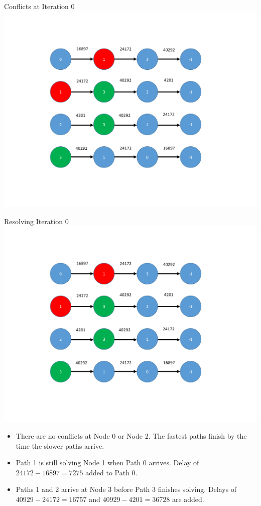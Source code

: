 \documentclass[xcolor={usenames,dvipsnames,svgnames,table}]{beamer}
\begin{document}
\begin{frame}[t]{Conflicts at Iteration 0}
\centering
\includegraphics[trim={2cm 2cm 4cm 2cm},clip,scale=0.45]{figures/solve_only_conflicts.pdf}
\end{frame}

\begin{frame}[t]{Resolving Iteration 0}
\centering
\includegraphics[trim={2cm 2cm 4cm 2cm},clip,scale=0.2]{figures/solve_only_conflicts.pdf}
\begin{block}{}
\begin{itemize}
\item There are no conflicts at Node 0 or Node 2. The fastest paths finish by the time the slower paths arrive.
\item Path 1 is still solving Node 1 when Path 0 arrives. Delay of $24172-16897=7275$ added to Path 0.
\item Paths 1 and 2 arrive at Node 3 before Path 3 finishes solving. Delays of $40929-24172=16757$ and $40929-4201=36728$  are added.
\end{itemize}
\end{block}
\end{frame}
\end{document}
